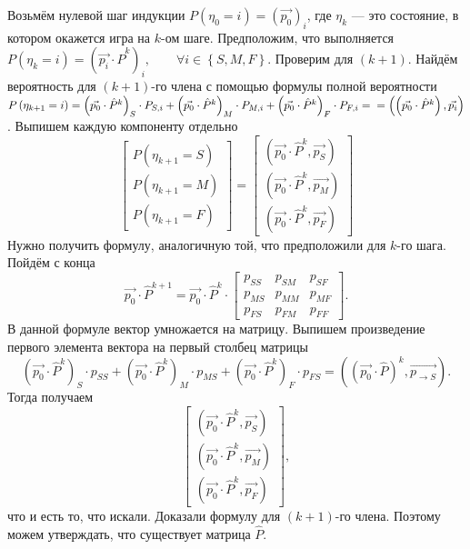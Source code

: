 Возьмём нулевой шаг индукции $P \left( \eta_0 = i \right) = \left( \vec{p_0} \right)_i$, где $ \eta_k$ --- это состояние, в котором окажется игра на $k$-ом шаге.
Предположим, что выполняется $P \left( \eta_k = i \right) = \left( \vec{p_i} \cdot \hat{P}^k \right)_i, \qquad \forall i \in \left\{ S, M , F \right\} $.
Проверим для $ \left( k+1 \right) $.
Найдём вероятность для $ \left( k+1 \right)$-го члена с помощью формулы полной вероятности
$P \left( \eta_{k+1} = i \right) =
\left( \vec{p_0} \cdot \hat{P}^k \right)_S \cdot P_{S, i} +
\left( \vec{p_0} \cdot \hat{P}^k \right)_M \cdot P_{M, i} +
\left( \vec{p_0} \cdot \hat{P}^k \right)_F \cdot P_{F, i} = \\
= \left( \left( \vec{p_0} \cdot \hat{P}^k \right), \vec{p_i} \right)$.
Выпишем каждую компоненту отдельно
$$\begin{bmatrix}
       P \left( \eta_{k+1} = S \right) \\
       P \left( \eta_{k+1} = M \right) \\
       P \left( \eta_{k+1} = F \right)
   \end{bmatrix} =
\begin{bmatrix}
       \left( \vec{p_0} \cdot \hat{P}^k, \vec{p_S} \right) \\
       \left( \vec{p_0} \cdot \hat{P}^k, \vec{p_M} \right) \\
       \left( \vec{p_0} \cdot \hat{P}^k, \vec{p_F} \right)
\end{bmatrix}$$
Нужно получить формулу, аналогичную той, что предположили для $k$-го шага.
Пойдём с конца
$$ \vec{p_0} \cdot \hat{P}^{k+1} =
\vec{p_0} \cdot \hat{P}^k \cdot
\begin{bmatrix}
       p_{SS} & p_{SM} & p_{SF} \\
       p_{MS} & p_{MM} & p_{MF} \\
       p_{FS} & p_{FM} & p_{FF}
\end{bmatrix}.$$
В данной формуле вектор умножается на матрицу.
Выпишем произведение первого элемента вектора на первый столбец матрицы
$$ \left( \vec{p_0} \cdot \hat{P}^k \right)_S \cdot p_{SS} +
\left( \vec{p_0} \cdot \hat{P}^k \right)_M \cdot p_{MS} +
\left( \vec{p_0} \cdot \hat{P}^k \right)_F \cdot p_{FS} =
\left( \left( \vec{p_0} \cdot \hat{P} \right)^k, \vec{p_{\rightarrow S}} \right).$$
Тогда получаем
$$\begin{bmatrix}
       \left( \vec{p_0} \cdot \hat{P}^k, \vec{p_S} \right) \\
       \left( \vec{p_0} \cdot \hat{P}^k, \vec{p_M} \right) \\
       \left( \vec{p_0} \cdot \hat{P}^k, \vec{p_F} \right)
\end{bmatrix},$$
что и есть то, что искали.
Доказали формулу для $ \left( k+1 \right)$-го члена.
Поэтому можем утверждать, что существует матрица $ \hat{P}$.

